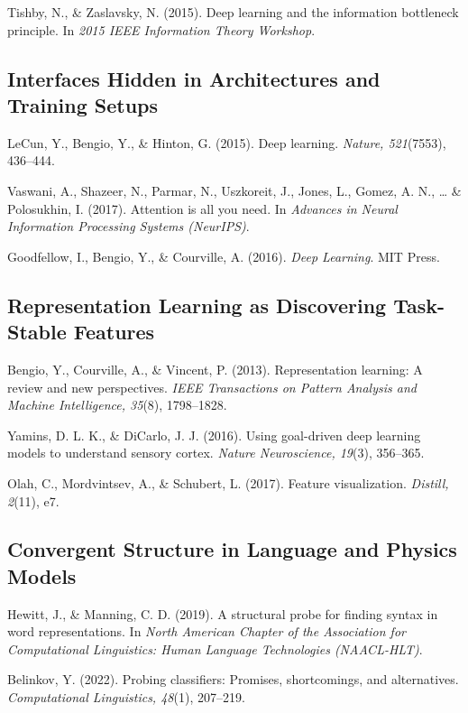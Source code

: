 \documentclass[
  openright]{book}
\begin{document}
Tishby, N., \& Zaslavsky, N. (2015). Deep learning and the information
bottleneck principle. In \emph{2015 IEEE Information Theory Workshop}.

\subsection{Interfaces Hidden in Architectures and Training
Setups}\label{interfaces-hidden-in-architectures-and-training-setups}

LeCun, Y., Bengio, Y., \& Hinton, G. (2015). Deep learning.
\emph{Nature, 521}(7553), 436--444.

Vaswani, A., Shazeer, N., Parmar, N., Uszkoreit, J., Jones, L., Gomez,
A. N., \ldots{} \& Polosukhin, I. (2017). Attention is all you need. In
\emph{Advances in Neural Information Processing Systems (NeurIPS)}.

Goodfellow, I., Bengio, Y., \& Courville, A. (2016). \emph{Deep
Learning}. MIT Press.

\subsection{Representation Learning as Discovering Task-Stable
Features}\label{representation-learning-as-discovering-task-stable-features}

Bengio, Y., Courville, A., \& Vincent, P. (2013). Representation
learning: A review and new perspectives. \emph{IEEE Transactions on
Pattern Analysis and Machine Intelligence, 35}(8), 1798--1828.

Yamins, D. L. K., \& DiCarlo, J. J. (2016). Using goal-driven deep
learning models to understand sensory cortex. \emph{Nature Neuroscience,
19}(3), 356--365.

Olah, C., Mordvintsev, A., \& Schubert, L. (2017). Feature
visualization. \emph{Distill, 2}(11), e7.

\subsection{Convergent Structure in Language and Physics
Models}\label{convergent-structure-in-language-and-physics-models}

Hewitt, J., \& Manning, C. D. (2019). A structural probe for finding
syntax in word representations. In \emph{North American Chapter of the
Association for Computational Linguistics: Human Language Technologies
(NAACL-HLT)}.

Belinkov, Y. (2022). Probing classifiers: Promises, shortcomings, and
alternatives. \emph{Computational Linguistics, 48}(1), 207--219.
\end{document}

